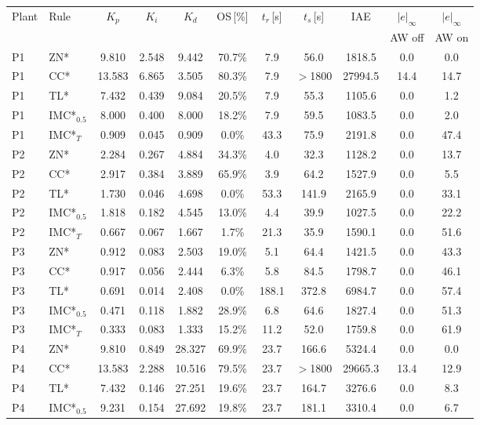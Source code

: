 \begin{tabular}{@{}llccccccccc@{}}
\toprule
Plant & Rule & $K_p$ & $K_i$ & $K_d$ & OS\,[\%] & $t_r$\,[s] & $t_s$\,[s] & IAE & $|e|_\infty$ & $|e|_\infty$ \\
 & & & & & & & & & AW off & AW on \\
\midrule
P1 & ZN* & 9.810 & 2.548 & 9.442 & 70.7\% & 7.9 & 56.0 & 1818.5 & 0.0 & 0.0 \\
P1 & CC* & 13.583 & 6.865 & 3.505 & 80.3\% & 7.9 & $>$1800 & 27994.5 & 14.4 & 14.7 \\
P1 & TL* & 7.432 & 0.439 & 9.084 & 20.5\% & 7.9 & 55.3 & 1105.6 & 0.0 & 1.2 \\
P1 & IMC*$_{0.5}$ & 8.000 & 0.400 & 8.000 & 18.2\% & 7.9 & 59.5 & 1083.5 & 0.0 & 2.0 \\
P1 & IMC*$_{T}$ & 0.909 & 0.045 & 0.909 & 0.0\% & 43.3 & 75.9 & 2191.8 & 0.0 & 47.4 \\
\midrule
P2 & ZN* & 2.284 & 0.267 & 4.884 & 34.3\% & 4.0 & 32.3 & 1128.2 & 0.0 & 13.7 \\
P2 & CC* & 2.917 & 0.384 & 3.889 & 65.9\% & 3.9 & 64.2 & 1527.9 & 0.0 & 5.5 \\
P2 & TL* & 1.730 & 0.046 & 4.698 & 0.0\% & 53.3 & 141.9 & 2165.9 & 0.0 & 33.1 \\
P2 & IMC*$_{0.5}$ & 1.818 & 0.182 & 4.545 & 13.0\% & 4.4 & 39.9 & 1027.5 & 0.0 & 22.2 \\
P2 & IMC*$_{T}$ & 0.667 & 0.067 & 1.667 & 1.7\% & 21.3 & 35.9 & 1590.1 & 0.0 & 51.6 \\
\midrule
P3 & ZN* & 0.912 & 0.083 & 2.503 & 19.0\% & 5.1 & 64.4 & 1421.5 & 0.0 & 43.3 \\
P3 & CC* & 0.917 & 0.056 & 2.444 & 6.3\% & 5.8 & 84.5 & 1798.7 & 0.0 & 46.1 \\
P3 & TL* & 0.691 & 0.014 & 2.408 & 0.0\% & 188.1 & 372.8 & 6984.7 & 0.0 & 57.4 \\
P3 & IMC*$_{0.5}$ & 0.471 & 0.118 & 1.882 & 28.9\% & 6.8 & 64.6 & 1827.4 & 0.0 & 51.3 \\
P3 & IMC*$_{T}$ & 0.333 & 0.083 & 1.333 & 15.2\% & 11.2 & 52.0 & 1759.8 & 0.0 & 61.9 \\
\midrule
P4 & ZN* & 9.810 & 0.849 & 28.327 & 69.9\% & 23.7 & 166.6 & 5324.4 & 0.0 & 0.0 \\
P4 & CC* & 13.583 & 2.288 & 10.516 & 79.5\% & 23.7 & $>$1800 & 29665.3 & 13.4 & 12.9 \\
P4 & TL* & 7.432 & 0.146 & 27.251 & 19.6\% & 23.7 & 164.7 & 3276.6 & 0.0 & 8.3 \\
P4 & IMC*$_{0.5}$ & 9.231 & 0.154 & 27.692 & 19.8\% & 23.7 & 181.1 & 3310.4 & 0.0 & 6.7 \\

\end{tabular}

